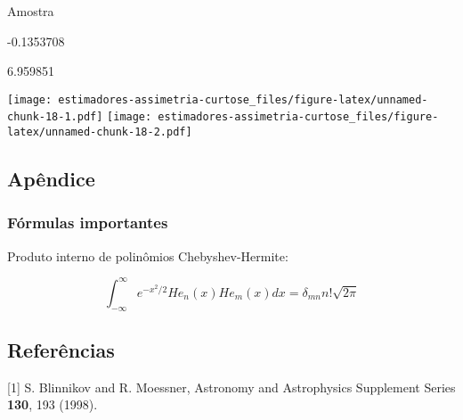 \documentclass[]{article}
\newenvironment{Shaded}{\begin{snugshade}}{\end{snugshade}}
\newcommand{\KeywordTok}[1]{\textcolor[rgb]{0.13,0.29,0.53}{\textbf{#1}}}
\newcommand{\DataTypeTok}[1]{\textcolor[rgb]{0.13,0.29,0.53}{#1}}
\newcommand{\DecValTok}[1]{\textcolor[rgb]{0.00,0.00,0.81}{#1}}
\newcommand{\StringTok}[1]{\textcolor[rgb]{0.31,0.60,0.02}{#1}}
\newcommand{\OperatorTok}[1]{\textcolor[rgb]{0.81,0.36,0.00}{\textbf{#1}}}
\newcommand{\NormalTok}[1]{#1}
\begin{document}
Amostra

-0.1353708

6.959851

\begin{Shaded}
\end{Shaded}

\texttt{[image: estimadores-assimetria-curtose\_files/figure-latex/unnamed-chunk-18-1.pdf]}
\texttt{[image: estimadores-assimetria-curtose\_files/figure-latex/unnamed-chunk-18-2.pdf]}

\subsection{Apêndice}\label{apendice}

\subsubsection{Fórmulas importantes}\label{formulas-importantes}

Produto interno de polinômios Chebyshev-Hermite:

\[
\int^\infty_{-\infty} e^{-x^2/2} He_n(x) He_m(x) dx = \delta_{mn} n! \sqrt{2\pi}
\]

\subsection*{Referências}\label{referencias}

\hypertarget{refs}{}
\hypertarget{ref-blinnikov1998}{}
{[}1{]} S. Blinnikov and R. Moessner, Astronomy and Astrophysics
Supplement Series \textbf{130}, 193 (1998).
\end{document}

